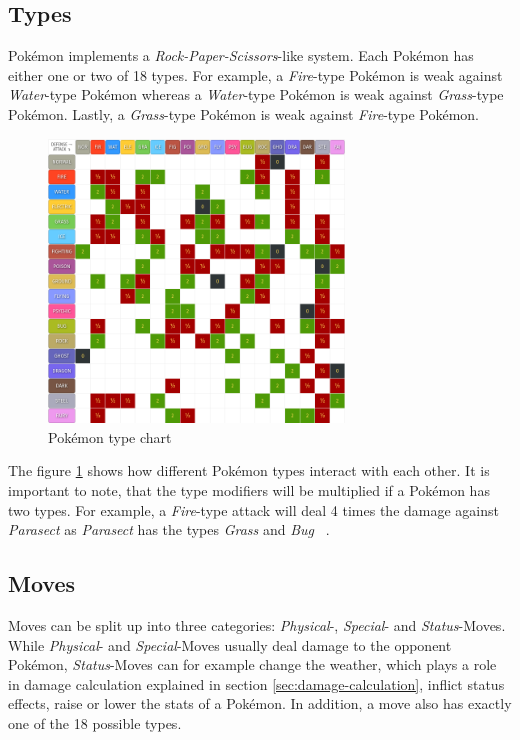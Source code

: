 \subsection{Types}
\label{sec:types}
Pokémon implements a \textit{Rock-Paper-Scissors}-like system. Each Pokémon has either one or two of 
18 types. For example, a \textit{Fire}-type Pokémon is weak against \textit{Water}-type Pokémon
whereas a \textit{Water}-type Pokémon is weak against \textit{Grass}-type Pokémon. Lastly,
a \textit{Grass}-type Pokémon is weak against \textit{Fire}-type Pokémon. 
\begin{figure}
	\centering
	\includegraphics[width=0.7\textwidth]{images/type_chart.png}
	\caption{Pokémon type chart ~\autocite{Pokemondb:Type}}
	\label{fig:type_chart}
\end{figure}
The figure \ref{fig:type_chart} shows how different Pokémon types interact with each other. It is important
to note, that the type modifiers will be multiplied if a Pokémon has two types. For example, a \textit{Fire}-type
attack will deal 4 times the damage against \textit{Parasect} as \textit{Parasect} has the types \textit{Grass} and
\textit{Bug} ~\autocite{Veekun:Parasect}.

\subsection{Moves}
\label{sec:moves}
Moves can be split up into three categories: \textit{Physical}-, \textit{Special}- and \textit{Status}-Moves.
While \textit{Physical}- and \textit{Special}-Moves usually deal damage to the opponent Pokémon, 
\textit{Status}-Moves can for example change the weather, which plays a role in damage calculation explained
in section \ref{sec:damage-calculation}, inflict status effects, raise or lower the stats of a Pokémon. In 
addition, a move also has exactly one of the 18 possible types.

